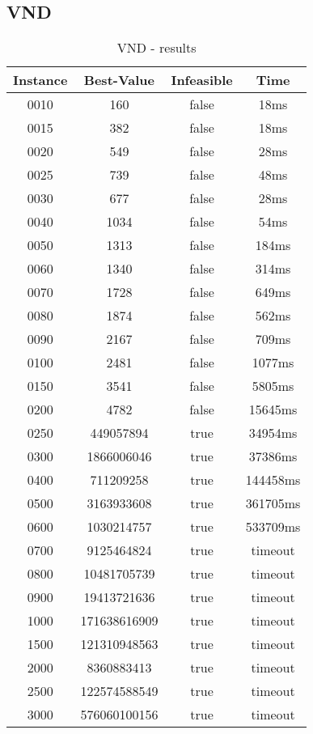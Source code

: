  \subsection*{VND}
\begin{table}[H]
	\centering
	\begin{tabular}{|| c | c | c | c ||} 
		\hline
		Instance & Best-Value & Infeasible & Time \\
		\hline\hline
		0010 & 160 & false & 18ms \\
		0015 & 382 & false & 18ms \\
		0020 & 549 & false & 28ms \\
		0025 & 739 & false & 48ms \\
		0030 & 677 & false & 28ms \\
		0040 & 1034 & false & 54ms \\
		0050 & 1313 & false & 184ms \\
		0060 & 1340 & false & 314ms \\
		0070 & 1728 & false & 649ms \\
		0080 & 1874 & false & 562ms \\
		0090 & 2167 & false & 709ms \\
		0100 & 2481 & false & 1077ms \\
		0150 & 3541 & false & 5805ms \\
		0200 & 4782 & false & 15645ms \\
		0250 & 449057894 & true & 34954ms \\
		0300 & 1866006046 & true & 37386ms \\
		0400 & 711209258 & true & 144458ms \\
		0500 & 3163933608 & true & 361705ms \\
		0600 & 1030214757 & true & 533709ms \\
		0700 & 9125464824 & true & timeout \\
		0800 & 10481705739 & true & timeout \\
		0900 & 19413721636 & true & timeout \\
		1000 & 171638616909 & true & timeout \\
		1500 & 121310948563 & true & timeout \\
		2000 & 8360883413 & true & timeout \\
		2500 & 122574588549 & true & timeout \\
		3000 & 576060100156 & true & timeout \\
		\hline
	\end{tabular}
	\caption{VND - results}
\end{table}
